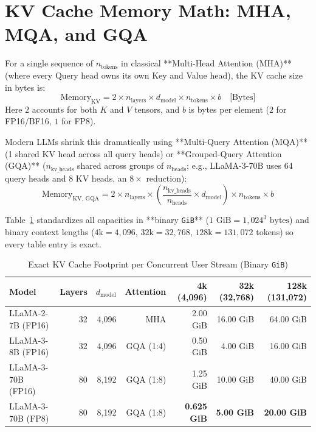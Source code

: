 \section{KV Cache Memory Math: MHA, MQA, and GQA}

For a single sequence of $n_{\text{tokens}}$ in classical **Multi-Head Attention (MHA)** (where every Query head owns its own Key and Value head), the KV cache size in bytes is:
\begin{equation}
\text{Memory}_{\text{KV}} = 2 \times n_{\text{layers}} \times d_{\text{model}} \times n_{\text{tokens}} \times b \quad \text{[Bytes]}
\end{equation}
Here $2$ accounts for both $K$ and $V$ tensors, and $b$ is bytes per element ($2$ for FP16/BF16, $1$ for FP8).

Modern LLMs shrink this dramatically using **Multi-Query Attention (MQA)** (1 shared KV head across all query heads) or **Grouped-Query Attention (GQA)** ($n_{\text{kv\_heads}}$ shared across groups of $n_{\text{heads}}$; e.g., LLaMA-3-70B uses 64 query heads and 8 KV heads, an $8\times$ reduction):
\begin{equation}
\text{Memory}_{\text{KV, GQA}} = 2 \times n_{\text{layers}} \times \left(\frac{n_{\text{kv\_heads}}}{n_{\text{heads}}} \times d_{\text{model}}\right) \times n_{\text{tokens}} \times b
\end{equation}

Table~\ref{tab:v5-ch09-kv-cache} standardizes all capacities in **binary \texttt{GiB}** ($1\text{ GiB} = 1,024^3\text{ bytes}$) and binary context lengths ($4\text{k} = 4,096$, $32\text{k} = 32,768$, $128\text{k} = 131,072$ tokens) so every table entry is exact.

\begin{table}[htbp]
\centering\footnotesize
\begin{tabular}{lrrrrrr}
\toprule
\textbf{Model} & \textbf{Layers} & \textbf{$d_{\text{model}}$} & \textbf{Attention} & \textbf{4k (4,096)} & \textbf{32k (32,768)} & \textbf{128k (131,072)} \\
\midrule
LLaMA-2-7B (FP16) & 32 & 4,096 & MHA & 2.00 GiB & 16.00 GiB & 64.00 GiB \\
LLaMA-3-8B (FP16) & 32 & 4,096 & GQA (1:4) & 0.50 GiB & 4.00 GiB & 16.00 GiB \\
LLaMA-3-70B (FP16) & 80 & 8,192 & GQA (1:8) & 1.25 GiB & 10.00 GiB & 40.00 GiB \\
LLaMA-3-70B (FP8) & 80 & 8,192 & GQA (1:8) & \textbf{0.625 GiB} & \textbf{5.00 GiB} & \textbf{20.00 GiB} \\
\bottomrule
\end{tabular}
\caption{Exact KV Cache Footprint per Concurrent User Stream (Binary \texttt{GiB})}
\label{tab:v5-ch09-kv-cache}
\end{table}

